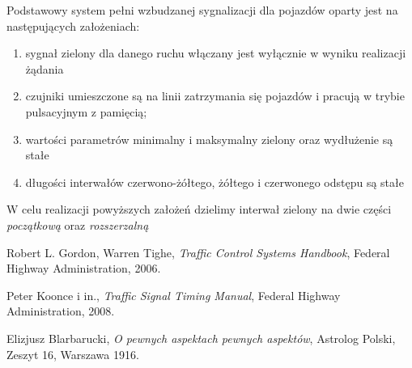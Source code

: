 \documentclass{pracamgr}
\begin{document}
Podstawowy system pełni wzbudzanej sygnalizacji dla pojazdów oparty
jest na następujących założeniach:
\begin{enumerate}
  \item sygnał zielony dla danego ruchu włączany jest wyłącznie w
  wyniku realizacji żądania
  \item czujniki umieszczone są na linii zatrzymania się pojazdów i
  pracują w trybie pulsacyjnym z pamięcią; 
  \item wartości parametrów minimalny i maksymalny zielony oraz
  wydłużenie są stałe
  \item długości interwałów czerwono-żółtego, żółtego i czerwonego
  odstępu są stałe
\end{enumerate}
W celu realizacji powyższych założeń dzielimy interwał zielony na dwie
części \emph{początkową} oraz \emph{rozszerzalną}

\begin{thebibliography}{99}

 Robert L. Gordon, Warren Tighe,
\textit{Traffic Control Systems Handbook}, Federal Highway
Administration, 2006.

 Peter Koonce i in., \textit{Traffic Signal
  Timing Manual}, Federal Highway Administration, 2008.



 Elizjusz Blarbarucki, \textit{O pewnych
    aspektach pewnych aspektów}, Astrolog Polski, Zeszyt 16, Warszawa
  1916.
\end{thebibliography}
\end{document}
